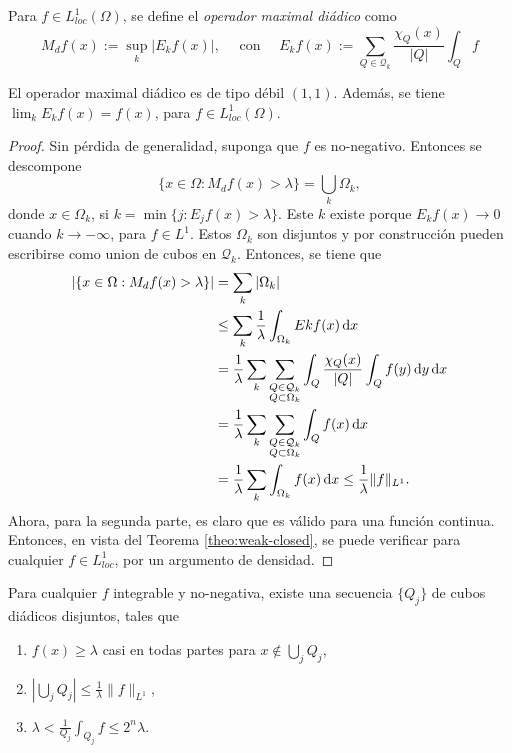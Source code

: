 \begin{definition}
	Para $f\in L^1_{loc}(\Omega)$, se define el \textit{operador maximal diádico} como 
	\begin{equation*}
		M_df(x) := \sup_k |E_kf(x)|, \quad \text{ con } \quad E_kf(x) := \sum_{Q\in\mathcal{Q}_k} \frac{\chi_Q(x)}{|Q|} \int_Q f 
	\end{equation*}
\end{definition}
\begin{theorem}
	El operador maximal diádico es de tipo débil $(1, 1)$. Además, se tiene $\lim_k E_k f(x) = f(x) $, para $f\in L^1_{loc}(\Omega)$.
\end{theorem}
\begin{proof}
	Sin pérdida de generalidad, suponga que $f$ es no-negativo. Entonces se descompone 
	\begin{equation*}
		\{x\in\Omega: M_df(x)>\lambda\} = \bigcup_k \Omega_k,
	\end{equation*}
	donde $x\in\Omega_k$, si $k = \min\{j: E_jf(x) > \lambda\}$. Este $k$ existe porque $E_kf(x)\to0$ cuando $k\to-\infty$, para $f\in L^1$. Estos $\Omega_k$ son disjuntos y por construcción pueden escribirse como union de cubos en $\mathcal{Q}_k$. Entonces, se tiene que 
	\begin{align*}
		| \{x\in\Omega: M_df(x)>\lambda\}  | & = \sum_k |\Omega_k| \\
		& \leq \sum_k \frac{1}{\lambda} \int_{\Omega_k} Ek f(x)\mathop{}\!\mathrm{d} x \\
		& = \frac{1}{\lambda} \sum_k \sum_{\substack{Q\in\mathcal{Q}_k\\ Q\subset\Omega_k}} \int_Q \frac{\chi_Q(x)}{|Q|}\int_Q f(y) \mathop{}\!\mathrm{d} y \mathop{}\!\mathrm{d} x \\
		& = \frac{1}{\lambda} \sum_k \sum_{\substack{Q\in\mathcal{Q}_k\\ Q\subset\Omega_k}} \int_Q f(x) \mathop{}\!\mathrm{d} x \\
		& = \frac{1}{\lambda} \sum_k \int_{\Omega_k} f(x)\mathop{}\!\mathrm{d} x
		\leq \frac{1}{\lambda} \|f\|_{L^1}.
	\end{align*}
	Ahora, para la segunda parte, es claro que es válido para una función continua. Entonces, en vista del Teorema \ref{theo:weak-closed}, se puede verificar para cualquier $f\in L^1_{loc}$, por un argumento de densidad.
\end{proof}
\begin{theorem}\label{theo:Calderon-Zygmund}
	Para cualquier $f$ integrable y no-negativa, existe una secuencia $\{Q_j\}$ de cubos diádicos disjuntos, tales que 
	\begin{enumerate}
		\item $f(x)\geq \lambda$ casi en todas partes para $x\notin \bigcup_j Q_j$,
		\item $\left|\bigcup_jQ_j\right| \leq \frac{1}{\lambda}\|f\|_{L^1}$,
		\item $\lambda < \frac{1}{Q_j}\int_{Q_j}f \leq 2^n\lambda$.
	\end{enumerate}
\end{theorem}
